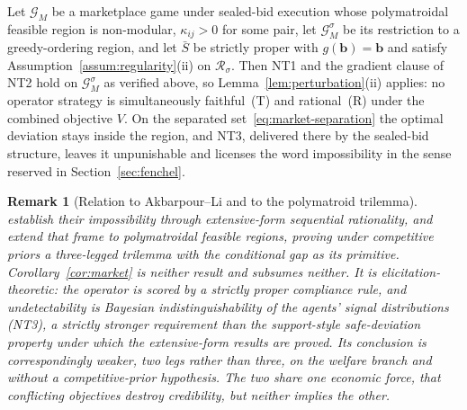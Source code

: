\documentclass[acmsmall,nonacm,screen]{acmart}
\theoremstyle{acmplain}%
\theoremstyle{acmdefinition}%
\newtheorem{remark}[theorem]{Remark}%
\newcommand{\calG}{\mathcal{G}}
\newcommand{\calR}{\mathcal{R}}
\newcommand{\Sbar}{\bar{S}}
\numberwithin{equation}{section}
\begin{document}
\begin{corollary}\label{cor:market}
Let $\calG_M$ be a marketplace game under sealed-bid execution whose polymatroidal feasible region is non-modular, $\kappa_{ij} > 0$ for some pair, let $\calG_M^\sigma$ be its restriction to a greedy-ordering region, and let $\Sbar$ be strictly proper with $g(\mathbf{b}) = \mathbf{b}$ and satisfy Assumption~\ref{assum:regularity}(ii) on $\calR_\sigma$. Then NT1 and the gradient clause of NT2 hold on $\calG_M^\sigma$ as verified above, so Lemma~\ref{lem:perturbation}(ii) applies: no operator strategy is simultaneously faithful~(T) and rational~(R) under the combined objective $V$. On the separated set~\eqref{eq:market-separation} the optimal deviation stays inside the region, and NT3, delivered there by the sealed-bid structure, leaves it unpunishable and licenses the word impossibility in the sense reserved in Section~\ref{sec:fenchel}.
\end{corollary}

\begin{remark}[Relation to Akbarpour--Li and to the polymatroid trilemma]\label{rem:al-relationship}
\citet{akbarpour2020credible} establish their impossibility through extensive-form sequential rationality, and \citet{loven2026trilemma} extend that frame to polymatroidal feasible regions, proving under competitive priors a three-legged trilemma with the conditional gap as its primitive. Corollary~\ref{cor:market} is neither result and subsumes neither. It is elicitation-theoretic: the operator is scored by a strictly proper compliance rule, and undetectability is Bayesian indistinguishability of the agents' signal distributions (NT3), a strictly stronger requirement than the support-style safe-deviation property under which the extensive-form results are proved. Its conclusion is correspondingly weaker, two legs rather than three, on the welfare branch and without a competitive-prior hypothesis. The two share one economic force, that conflicting objectives destroy credibility, but neither implies the other.
\end{remark}
\end{document}
